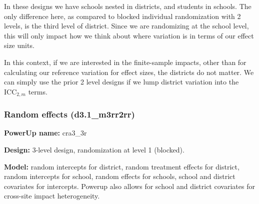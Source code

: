 \documentclass[12pt]{article}
\begin{document}
In these designs we have schools nested in districts, and students in schools.
The only difference here, as compared to blocked individual randomization with 2 levels, is the third level of district.
Since we are randomizing at the school level, this will only impact how we think about where variation is in terms of our effect size units.

In this context, if we are interested in the finite-sample impacts, other than for calculating our reference variation for effect sizes, the districts do not matter.
We can simply use the prior 2 level designs if we lump district variation into the $\text{ICC}_{2,m}$ terms.



\subsubsection{Random effects (d3.1\_m3rr2rr)}

\textbf{PowerUp name:} cra3\_3r

\textbf{Design:} 3-level design, randomization at level 1 (blocked).

\textbf{Model:} random intercepts for district, random treatment effects for district, random intercepts for school, random effects for schools, school and district covariates for intercepts. Powerup also allows for school and district covariates for cross-site impact heterogeneity.
\end{document}
